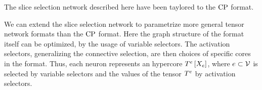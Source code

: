 
The slice selection network described here have been taylored to the $\mathrm{CP}$ format.

We can extend the slice selection network to parametrize more general tensor network formats than the $\mathrm{CP}$ format.
Here the graph structure of the format itself can be optimized, by the usage of variable selectors.
The activation selectors, generalizing the connective selection, are then choices of specific cores in the format.
Thus, each neuron represents an hypercore $T^{e}\left[X_{e}\right]$, where $e\subset\mathcal{V}$ is selected by variable selectors and the values of the tensor $T^{e}$ by activation selectors.

